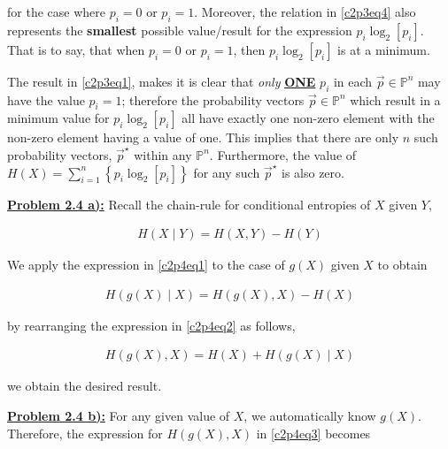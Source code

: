 \documentclass{article}[12pt]
\numberwithin{equation}{subsection}
\newcommand{\prob}[1]{\textbf{\underline{Problem #1):}}}
\begin{document}
\begin{flushleft}
for the case where $p_i = 0$ or $p_i = 1$.  Moreover, the relation in \ref{c2p3eq4} also represents the \textbf{smallest} possible value/result for the expression $p_i \log_2 \left[ p_i \right]$.  That is to say, that when $p_i = 0$ or $p_i = 1$, then $p_i \log_2 \left[ p_i \right]$ is at a minimum.  \newline


The result in \ref{c2p3eq1}, makes it is clear that \emph{only} \textbf{\underline{ONE}} $p_i$ in each $\vec{p} \in \mathbb{P}^n$ may have the value $p_i = 1$; therefore the probability vectors $\vec{p} \in \mathbb{P}^n$ which result in a minimum value for $p_i \log_2 \left[ p_i \right]$ all have exactly one non-zero element with the non-zero element having a value of one.  This implies that there are only $n$ such probability vectors, $\vec{p}^\star$ within any $\mathbb{P}^n$.  Furthermore, the value of $H(X) = \sum_{i=1}^n \left\{ p_i \log_2 \left[ p_i \right] \right\}$ for any such $\vec{p}^\star$ is also zero.



\vspace{0.5in}

\prob{2.4 a}  Recall the chain-rule for conditional entropies of $X$ given $Y$,

\begin{align}  \label{c2p4eq1}
H \left( X \mid Y \right) = H \left( X, Y \right) - H \left( Y \right)  \tag{2.4-1}
\end{align}

We apply the expression in \ref{c2p4eq1} to the case of $g \left( X \right)$ given $X$ to obtain

\begin{align} \label{c2p4eq2}
H \left( g \left( X \right) \mid X \right) = H \left( g \left( X \right), X \right) - H \left( X \right)  \tag{2.4-2}
\end{align}

by rearranging the expression in \ref{c2p4eq2} as follows,

\begin{align} \label{c2p4eq3}
H \left( g \left( X \right), X \right) = H \left( X \right) + H \left( g \left( X \right) \mid X \right)  \tag{2.4-3}
\end{align}

we obtain the desired result.



\vspace{0.5in}

\prob{2.4 b}  For any given value of $X$, we automatically know $g \left( X \right)$.  Therefore, the expression for $H \left( g \left( X \right), X \right)$ in \ref{c2p4eq3} becomes


\end{flushleft}
\end{document}
